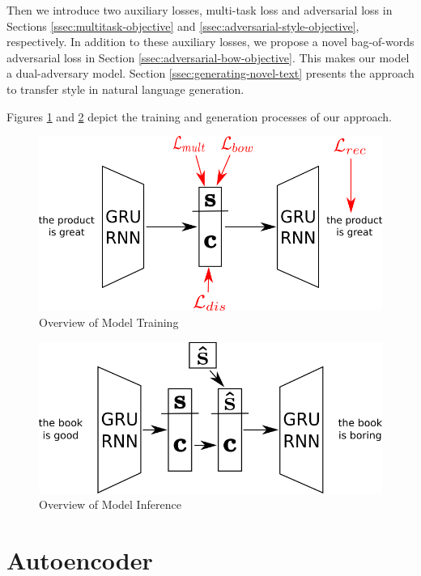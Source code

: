 Then we introduce two auxiliary losses, multi-task loss and adversarial loss in Sections \ref{ssec:multitask-objective} and \ref{ssec:adversarial-style-objective}, respectively. In addition to these auxiliary losses, we propose a novel bag-of-words adversarial loss in Section \ref{ssec:adversarial-bow-objective}. This makes our model a dual-adversary model. Section \ref{ssec:generating-novel-text} presents the approach to transfer style in natural language generation.

Figures \ref{fig:model-overview-training} and \ref{fig:model-overview-inference} depict the training and generation processes of our approach.

\begin{figure}[ht]
	\centering
	\includegraphics[width=\linewidth]{images/model-overview-training}
	\caption{Overview of Model Training}
	\label{fig:model-overview-training}
\end{figure}

\begin{figure}[ht]
	\centering
	\includegraphics[width=\linewidth]{images/model-overview-inference}
	\caption{Overview of Model Inference}
	\label{fig:model-overview-inference}
\end{figure}


\section{Autoencoder} \label{ssec:seq2seq-objective}

